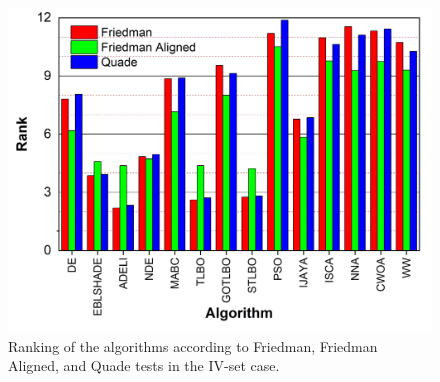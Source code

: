 \documentclass[a4paper,fleqn]{cas-dc}
\begin{document}
\begin{figure}[]
	\centering
		\includegraphics[width=1.0\columnwidth]{FigRankT}
	  \caption{Ranking of the algorithms according to Friedman, Friedman Aligned, and Quade tests in the IV-set case.}\label{figRankIVset}
\end{figure}
\end{document}
